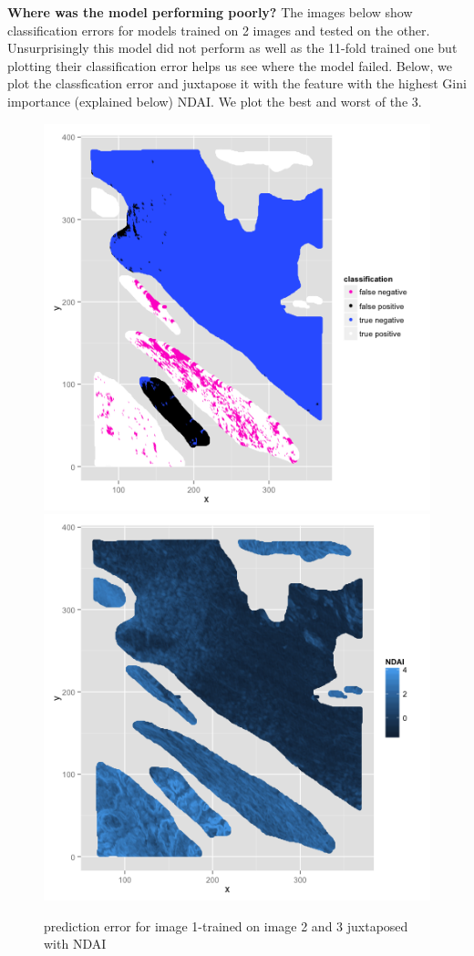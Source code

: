 \documentclass{article}\usepackage[]{graphicx}\usepackage[]{color}
\begin{document}
{\bf Where was the model performing poorly?}
The images below show classification errors for models trained on 2 images and tested on the other. Unsurprisingly this model did not perform as well as the 11-fold trained one but plotting their classification error helps us see where the model failed.  Below, we plot the classfication error and juxtapose it with the feature with the highest Gini importance (explained below) NDAI.  We plot the best and worst of the 3.  
  \begin{figure}[H]
  \includegraphics[width=\linewidth, height = 170pts ]{classification_image1.png}
\endminipage\hfill
{}
  \includegraphics[width=\linewidth, height = 170pts]{NDAI_image1.png}
\endminipage\hfill
\caption{prediction error for image 1-trained on image 2 and 3 juxtaposed with NDAI}
\end{figure}
\end{document}
